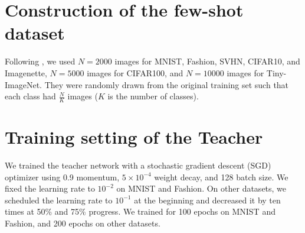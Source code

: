 \section{Construction of the few-shot dataset}
\begin{foldable}
    Following \cite{wang2020neural,nguyen2022black}, we used $N=2000$ images for MNIST, Fashion, SVHN, CIFAR10, and Imagenette, $N=5000$ images for CIFAR100, and $N=10000$ images for Tiny-ImageNet.
    They were randomly drawn from the original training set such that each class had $\frac{N}{K}$ images ($K$ is the number of classes).
\end{foldable}


\section{Training setting of the Teacher}
\begin{foldable}
    We trained the teacher network with a stochastic gradient descent (SGD) optimizer using 0.9 momentum, $5\times10^{-4}$ weight decay, and 128 batch size.
    We fixed the learning rate to $10^{-2}$ on MNIST and Fashion.
    On other datasets, we scheduled the learning rate to $10^{-1}$ at the beginning and decreased it by ten times at 50\% and 75\% progress.
    We trained for 100 epochs on MNIST and Fashion, and 200 epochs on other datasets.
\end{foldable}



